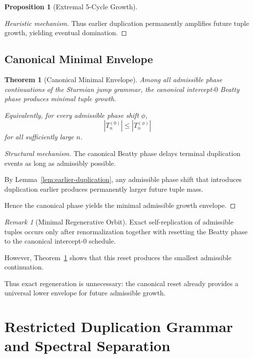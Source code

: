 \documentclass[12pt, oneside]{article}
\numberwithin{equation}{section}
\theoremstyle{definition}
\newtheorem{proposition}{Proposition}[section]
\theoremstyle{plain}
\newtheorem{theorem}{Theorem}[section]
\theoremstyle{remark}
\newtheorem*{remark}{Remark}
\begin{document}
\begin{proposition}[Extremal 5-Cycle Growth]
\begin{proof}[Heuristic mechanism]
Thus earlier duplication permanently amplifies future tuple growth,
yielding eventual domination.
\end{proof}


\subsection{Canonical Minimal Envelope}


\begin{theorem}[Canonical Minimal Envelope]
\label{thm:minimal-envelope}
Among all admissible phase continuations of the Sturmian jump grammar,
the canonical intercept-$0$ Beatty phase produces minimal tuple growth.

Equivalently, for every admissible phase shift $\phi$,
\[
|T_n^{(0)}|
\le
|T_n^{(\phi)}|
\]
for all sufficiently large $n$.
\end{theorem}

\begin{proof}[Structural mechanism]
The canonical Beatty phase delays terminal duplication events
as long as admissibly possible.

By Lemma~\ref{lem:earlier-duplication}, any admissible phase shift
that introduces duplication earlier produces permanently larger
future tuple mass.

Hence the canonical phase yields the minimal admissible growth
envelope.
\end{proof}


\begin{remark}[Minimal Regenerative Orbit]
Exact self-replication of admissible tuples occurs only after
renormalization together with resetting the Beatty phase to the
canonical intercept-$0$ schedule.

However, Theorem~\ref{thm:minimal-envelope} shows that this reset
produces the smallest admissible continuation.

Thus exact regeneration is unnecessary:
the canonical reset already provides a universal lower envelope for
future admissible growth.
\end{remark}

\section{Restricted Duplication Grammar and Spectral Separation}
\label{sec:restricted-grammar}


\end{proposition}
\end{document}
